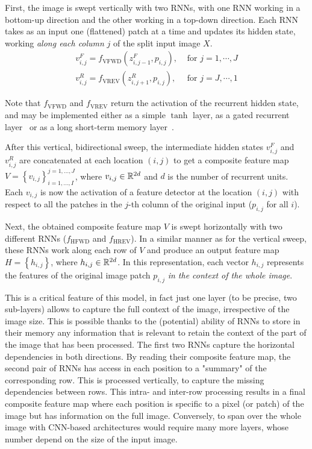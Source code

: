 First, the image is swept vertically with two RNNs, with one RNN working in
a bottom-up direction and the other working in a top-down direction.
Each RNN takes as an input one (flattened) patch at a time and updates its
hidden state, working \emph{along each column} $j$ of the split input image
$X$.
\begin{align}
    v^F_{i,j} = f_{\text{VFWD}}(z^F_{i,j-1},p_{i,j}), &\text{ for
    }j=1,\cdots, J\\
    v^R_{i,j} = f_{\text{VREV}}(z^R_{i,j+1},p_{i,j}), &\text{ for
    }j=J,\cdots,1
\end{align}

Note that $f_{\text{VFWD}}$ and $f_{\text{VREV}}$ return the activation of the
recurrent hidden state, and may be implemented either as a simple $\tanh$
layer, as a gated recurrent layer~\citep{Cho2014} or as a long short-term
memory layer~\citep{Hochreiter+Schmidhuber-1997}.

After this vertical, bidirectional sweep, the intermediate hidden states
$v^F_{i,j}$ and $v^R_{i,j}$ are concatenated at each location $(i,j)$ to get a
composite feature map $V= \left\{ v_{i,j} \right\}_{i=1,\ldots,I}^{
j=1,\ldots,J}$, where $v_{i,j} \in \mathbb{R}^{2d}$ and $d$ is the number of recurrent
units.  Each $v_{i,j}$ is now the activation of a feature detector at the
location $(i,j)$ with respect to all the patches in the $j$-th column of the
original input ($p_{i, j}$ for all $i$).

Next, the obtained composite feature map $V$ is swept horizontally with two
different RNNs ($f_{\text{HFWD}}$ and $f_{\text{HREV}}$). In a similar manner
as for the vertical sweep, these RNNs work along each row of $V$ and produce an
output feature map $H = \left\{ h_{i,j} \right\}$, where $h_{i,j} \in
\mathbb{R}^{2d}$. In this representation, each vector $h_{i,j}$ represents the
features of the original image patch $p_{i,j}$ \emph{in the context of the
whole image}.

This is a critical feature of this model, in fact just one layer (to be
precise, two sub-layers) allows to capture the full context of the image,
irrespective of the image size. This is possible thanks to the (potential)
ability of RNNs to store in their memory any information that is relevant to
retain the context of the part of the image that has been processed. The first
two RNNs capture the horizontal dependencies in both directions. By reading
their composite feature map, the second pair of RNNs has access in each
position to a "summary" of the corresponding row. This is processed vertically,
to capture the missing dependencies between rows. This intra- and inter-row
processing results in a final composite feature map where each position is
specific to a pixel (or patch) of the image but has information on the full
image. Conversely, to span over the whole image with CNN-based architectures
would require many more layers, whose number depend on the size of the input
image.

